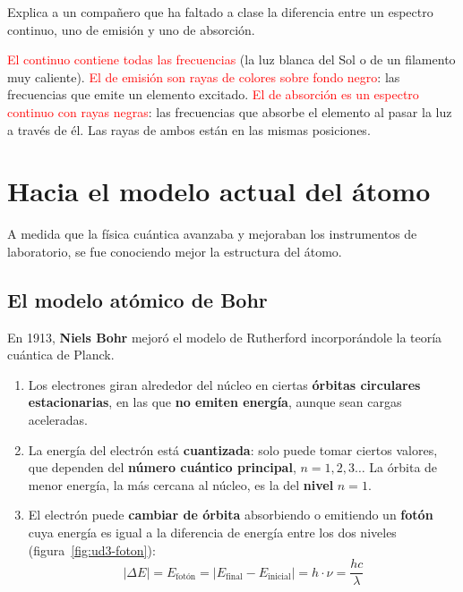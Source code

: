 \begin{exercise}
    Explica a un compañero que ha faltado a clase la diferencia entre un espectro continuo, uno de emisión y uno de absorción.
    \begin{solu}
        \textcolor{red}{El continuo contiene todas las frecuencias} (la luz blanca del Sol o de un filamento muy caliente).
        \textcolor{red}{El de emisión son rayas de colores sobre fondo negro}: las frecuencias que emite un elemento excitado.
        \textcolor{red}{El de absorción es un espectro continuo con rayas negras}: las frecuencias que absorbe el elemento al pasar
        la luz a través de él. Las rayas de ambos están en las mismas posiciones.
    \end{solu}
\end{exercise}

\section{Hacia el modelo actual del átomo}\label{sec:ud3-actual}

A medida que la física cuántica avanzaba y mejoraban los instrumentos de laboratorio, se fue conociendo mejor la estructura del
átomo.

\subsection{El modelo atómico de Bohr}

En 1913, \textbf{Niels Bohr} mejoró el modelo de Rutherford incorporándole la teoría cuántica de Planck.

\begin{definition}
    \leavevmode %
    \begin{enumerate}
        \item Los electrones giran alrededor del núcleo en ciertas \textbf{órbitas circulares estacionarias}, en las que
        \textbf{no emiten energía}, aunque sean cargas aceleradas.
        \item La energía del electrón está \textbf{cuantizada}: solo puede tomar ciertos valores, que dependen del
        \textbf{número cuántico principal}, \(n = 1, 2, 3\dots\) La órbita de menor energía, la más cercana al núcleo, es la del
        \textbf{nivel} \(n = 1\).
        \item El electrón puede \textbf{cambiar de órbita} absorbiendo o emitiendo un \textbf{fotón} cuya energía es igual a la
        diferencia de energía entre los dos niveles (figura~\ref{fig:ud3-foton}):
        \[ |\Delta E| = E_{\text{fotón}} = |E_{\text{final}} - E_{\text{inicial}}| = h \cdot \nu = \frac{h c}{\lambda} \]
    \end{enumerate}
\end{definition}

